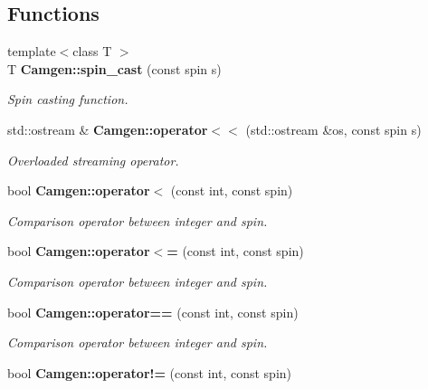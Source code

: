 \subsection*{Functions}
\begin{DoxyCompactItemize}
\item 
\hypertarget{a00878_ad7ab434e0e492da345671a1f3500ae0a}{}{\footnotesize template$<$class T $>$ }\\T {\bfseries Camgen\+::spin\+\_\+cast} (const spin s)\label{a00878_ad7ab434e0e492da345671a1f3500ae0a}

\begin{DoxyCompactList}\small\item\em Spin casting function. \end{DoxyCompactList}\item 
\hypertarget{a00878_a169990e0965b02e882b8d1fd528e38b8}{}std\+::ostream \& {\bfseries Camgen\+::operator$<$$<$} (std\+::ostream \&os, const spin s)\label{a00878_a169990e0965b02e882b8d1fd528e38b8}

\begin{DoxyCompactList}\small\item\em Overloaded streaming operator. \end{DoxyCompactList}\item 
\hypertarget{a00878_aedf2ac662128e6751448790f17804b27}{}bool {\bfseries Camgen\+::operator$<$} (const int, const spin)\label{a00878_aedf2ac662128e6751448790f17804b27}

\begin{DoxyCompactList}\small\item\em Comparison operator between integer and spin. \end{DoxyCompactList}\item 
\hypertarget{a00878_a39c564b592e32b0afb9194a44c51502f}{}bool {\bfseries Camgen\+::operator$<$=} (const int, const spin)\label{a00878_a39c564b592e32b0afb9194a44c51502f}

\begin{DoxyCompactList}\small\item\em Comparison operator between integer and spin. \end{DoxyCompactList}\item 
\hypertarget{a00878_a1a6a8e89789fe39a53887905bacbdc0f}{}bool {\bfseries Camgen\+::operator==} (const int, const spin)\label{a00878_a1a6a8e89789fe39a53887905bacbdc0f}

\begin{DoxyCompactList}\small\item\em Comparison operator between integer and spin. \end{DoxyCompactList}\item 
\hypertarget{a00878_a5628b75a61029b430b8acd8deebf7a2c}{}bool {\bfseries Camgen\+::operator!=} (const int, const spin)\label{a00878_a5628b75a61029b430b8acd8deebf7a2c}


\end{DoxyCompactItemize}
